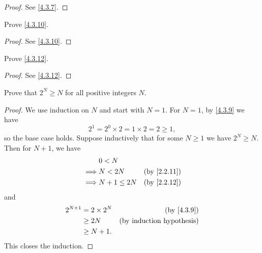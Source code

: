 \begin{proof}
  See \cref{4.3.7}.
\end{proof}

\begin{ex}\label{ex:4.3.3}
  Prove \cref{4.3.10}.
\end{ex}

\begin{proof}
  See \cref{4.3.10}.
\end{proof}

\begin{ex}
  Prove \cref{4.3.12}.
\end{ex}

\begin{proof}
  See \cref{4.3.12}.
\end{proof}

\begin{ex}\label{ex:4.3.5}
  Prove that \(2^N \geq N\) for all positive integers \(N\).
\end{ex}

\begin{proof}
  We use induction on \(N\) and start with \(N = 1\).
  For \(N = 1\), by \cref{4.3.9} we have
  \[
    2^1 = 2^0 \times 2 = 1 \times 2 = 2 \geq 1,
  \]
  so the base case holds.
  Suppose inductively that for some \(N \geq 1\) we have \(2^N \geq N\).
  Then for \(N + 1\), we have
  \begin{align*}
             & 0 < N                                     \\
    \implies & N < 2N        & \text{(by \cref{2.2.11})} \\
    \implies & N + 1 \leq 2N & \text{(by \cref{2.2.12})}
  \end{align*}
  and
  \begin{align*}
    2^{N + 1} & = 2 \times 2^N & \text{(by \cref{4.3.9})}         \\
              & \geq 2N        & \text{(by induction hypothesis)} \\
              & \geq N + 1.
  \end{align*}
  This closes the induction.
\end{proof}